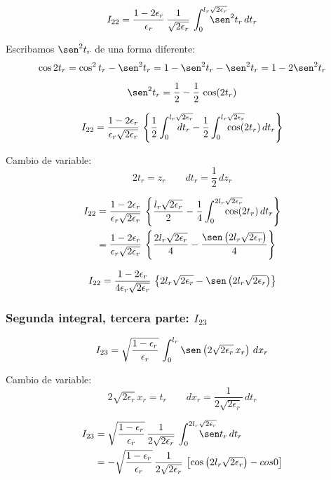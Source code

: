 \[
I_{22}
= 
\frac{1-2\epsilon_r}{\epsilon_r}\,
\frac{1}{\sqrt{2\epsilon_r}}\,
\int_{0}^{l_r\sqrt{2\epsilon_r}}\hspace*{-2em}\sen^2 t_r\, dt_r
\]

Escribamos $\sen^2 t_r$ de una forma diferente:
\[
\cos 2t_r = \cos^2 t_r - \sen^2 t_r = 1-\sen^2 t_r - \sen^2 t_r
= 1-2\sen^2 t_r
\]

\[
\sen^2 t_r = \frac{1}{2} - \frac{1}{2}\,\cos (2t_r)
\]

\[
I_{22}
= 
\frac{1-2\epsilon_r}{\epsilon_r\sqrt{2\epsilon_r}}\,
\left\lbrace
\frac{1}{2}\int_{0}^{l_r\sqrt{2\epsilon_r}}\hspace*{-2em}\,dt_r
- \frac{1}{2}\int_{0}^{l_r\sqrt{2\epsilon_r}}\hspace*{-2em}\cos(2t_r)\, dt_r
\right\rbrace
\]

Cambio de variable:
\[
2t_r = z_r
\hspace{2em}
dt_r = \frac{1}{2}\,dz_r
\]

\begin{align*}
I_{22}
&= 
\frac{1-2\epsilon_r}{\epsilon_r\sqrt{2\epsilon_r}}\,
\left\lbrace
\frac{l_r\sqrt{2\epsilon_r}}{2}
- \frac{1}{4}\int_{0}^{2l_r\sqrt{2\epsilon_r}}\hspace*{-2em}\cos(2t_r)\, dt_r
\right\rbrace\\
&= 
\frac{1-2\epsilon_r}{\epsilon_r\sqrt{2\epsilon_r}}\,
\left\lbrace
\frac{2l_r\sqrt{2\epsilon_r}}{4}
- \frac{\sen\left(2l_r\sqrt{2\epsilon_r}\right)}{4}
\right\rbrace
\end{align*}

\begin{equation}
\label{I22}
I_{22} =
\frac{1-2\epsilon_r}{4\epsilon_r\sqrt{2\epsilon_r}}\,
\left\lbrace
2l_r\sqrt{2\epsilon_r}
- \sen\left(2l_r\sqrt{2\epsilon_r}\right)
\right\rbrace
\end{equation}

\subsubsection{Segunda integral, tercera parte: $I_{23}$}

\[
I_{23}
= 
\sqrt{\frac{1-\epsilon_r}{\epsilon_r}}\,
\int_{0}^{l_r}\sen\left(2\sqrt{2\epsilon_r}\,x_r\right)\, dx_r
\]

Cambio de variable:
\[
2\sqrt{2\epsilon_r}\,x_r = t_r
\hspace{2em}
dx_r = \frac{1}{2\sqrt{2\epsilon_r}}\,dt_r
\]

\begin{align*}
I_{23}
&= 
\sqrt{\frac{1-\epsilon_r}{\epsilon_r}}\,
\frac{1}{2\sqrt{2\epsilon_r}}\,
\int_{0}^{2l_r\sqrt{2\epsilon_r}}\hspace*{-2em}\sen t_r\, dt_r\\
&= 
-\sqrt{\frac{1-\epsilon_r}{\epsilon_r}}\,
\frac{1}{2\sqrt{2\epsilon_r}}\,
\left[\cos\left(2l_r\sqrt{2\epsilon_r}\right) - cos 0\right]
\end{align*}

